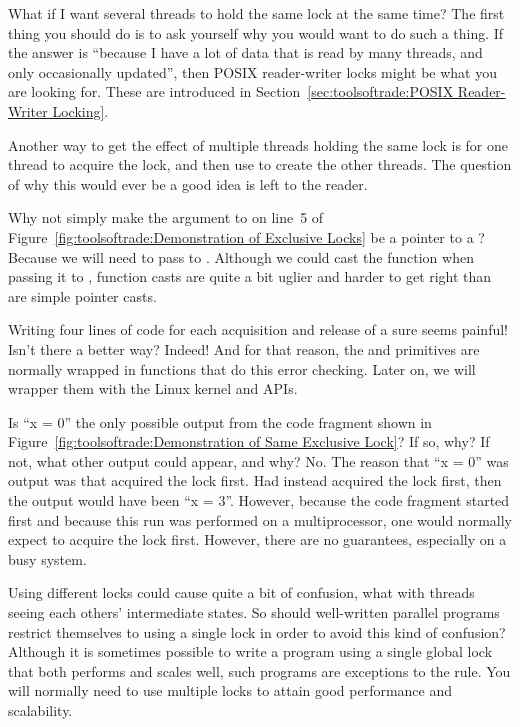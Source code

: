 \QuickQ{}
	What if I want several threads to hold the same lock at the
	same time?
\QuickA{}
	The first thing you should do is to ask yourself why you would
	want to do such a thing.
	If the answer is ``because I have a lot of data that is read
	by many threads, and only occasionally updated'', then
	POSIX reader-writer locks might be what you are looking for.
	These are introduced in
	Section~\ref{sec:toolsoftrade:POSIX Reader-Writer Locking}.

	Another way to get the effect of multiple threads holding
	the same lock is for one thread to acquire the lock, and
	then use  to create the other threads.
	The question of why this would ever be a good idea is left
	to the reader.

\QuickQ{}
	Why not simply make the argument to 
	on line~5 of
	Figure~\ref{fig:toolsoftrade:Demonstration of Exclusive Locks}
	be a pointer to a ?
\QuickA{}
	Because we will need to pass  to
	.
	Although we could cast the function when passing it to
	, function casts are quite a bit
	uglier and harder to get right than are simple pointer casts.

\QuickQ{}
	Writing four lines of code for each acquisition and release
	of a  sure seems painful!
	Isn't there a better way?
\QuickA{}
	Indeed!
	And for that reason, the  and
	 primitives are normally wrapped
	in functions that do this error checking.
	Later on, we will wrapper them with the Linux kernel
	 and  APIs.

\QuickQ{}
	Is ``x = 0'' the only possible output from the code fragment
	shown in
	Figure~\ref{fig:toolsoftrade:Demonstration of Same Exclusive Lock}?
	If so, why?
	If not, what other output could appear, and why?
\QuickA{}
	No.
	The reason that ``x = 0'' was output was that 
	acquired the lock first.
	Had  instead acquired the lock first, then
	the output would have been ``x = 3''.
	However, because the code fragment started  first
	and because this run was performed on a multiprocessor,
	one would normally expect  to acquire the
	lock first.
	However, there are no guarantees, especially on a busy system.

\QuickQ{}
	Using different locks could cause quite a bit of confusion,
	what with threads seeing each others' intermediate states.
	So should well-written parallel programs restrict themselves
	to using a single lock in order to avoid this kind of confusion?
\QuickA{}
	Although it is sometimes possible to write a program using a
	single global lock that both performs and scales well, such
	programs are exceptions to the rule.
	You will normally need to use multiple locks to attain good
	performance and scalability.

